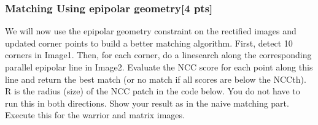 \documentclass[11pt]{article}
\begin{document}
    \hypertarget{matching-using-epipolar-geometry4-pts}{%
\subsubsection{Matching Using epipolar geometry{[}4
pts{]}}\label{matching-using-epipolar-geometry4-pts}}

We will now use the epipolar geometry constraint on the rectified images
and updated corner points to build a better matching algorithm. First,
detect 10 corners in Image1. Then, for each corner, do a linesearch
along the corresponding parallel epipolar line in Image2. Evaluate the
NCC score for each point along this line and return the best match (or
no match if all scores are below the NCCth). R is the radius (size) of
the NCC patch in the code below. You do not have to run this in both
directions. Show your result as in the naive matching part. Execute this
for the warrior and matrix images.
\end{document}
